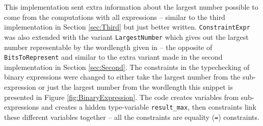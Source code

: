 This implementation sent extra information about the largest number possible to come from the computations with all expressions -- similar to the third implementation in Section \ref{sec:Third} but just better written. \verb+ConstraintExpr+ was also extended with the variant \verb+LargestNumber+ which gives out the largest number representable by the wordlength given in -- the opposite of \verb+BitsToRepresent+ and similar to the extra variant made in the second implementation in Section \ref{sec:Second}. The constraints in the typechecking of binary expressions were changed to either take the largest number from the sub-expression or just the largest number from the wordlength this snippet is presented in Figure \ref{fig:BinaryExpression}. The code creates variables from sub-expressions and creates a hidden type-variable \verb+result_max+, then constraints link these different variables together -- all the constraints are equality (\verb+=+) constraints.

